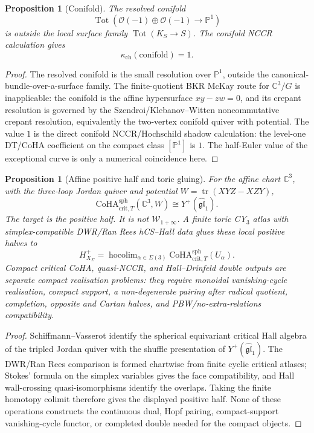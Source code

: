 \documentclass[11pt]{amsart}
\providecommand{\bC}{\mathbb{C}}
\providecommand{\bP}{\mathbb{P}}
\providecommand{\cO}{\mathcal{O}}
\providecommand{\CoHA}{\mathrm{CoHA}}
\providecommand{\Tot}{\operatorname{Tot}}
\newtheorem{proposition}[theorem]{Proposition}
\theoremstyle{definition}
\theoremstyle{remark}
\begin{document}
\begin{proposition}[Conifold]
The resolved conifold
\[
        \Tot(\cO(-1)\oplus\cO(-1)\to\bP^1)
\]
is outside the local surface family \(\Tot(K_S\to S)\). The conifold NCCR
calculation gives
\[
        \kappa_{\mathrm{ch}}(\mathrm{conifold})=1 .
\]
\end{proposition}

\begin{proof}
The resolved conifold is the small resolution over \(\bP^1\), outside the
canonical-bundle-over-a-surface family. The finite-quotient BKR McKay route
for \(\bC^3/G\) is inapplicable: the conifold is the affine hypersurface
\(xy-zw=0\), and its crepant resolution is governed by the
Szendroi/Klebanov--Witten noncommutative crepant resolution, equivalently
the two-vertex conifold quiver with potential. The value \(1\) is the
direct conifold NCCR/Hochschild shadow calculation: the level-one
DT/CoHA coefficient on the compact class \([\bP^1]\) is \(1\). The
half-Euler value of the exceptional curve is only a numerical coincidence
here.
\end{proof}

\begin{proposition}[Affine positive half and toric gluing]
For the affine chart \(\bC^3\), with the three-loop Jordan quiver and
potential \(W=\operatorname{tr}(XYZ-XZY)\),
\[
        \CoHA^{\mathrm{sph}}_{\mathrm{crit},T}(\bC^3,W)
        \cong
        Y^+(\widehat{\mathfrak{gl}}_1).
\]
The target is the positive half. It is not
\(\mathcal W_{1+\infty}\). A finite toric CY$_3$ atlas with
simplex-compatible DWR/Ran Rees hCS--Hall data glues these local positive
halves to
\[
        H^+_{X_\Sigma}
        =
        \operatorname{hocolim}_{\alpha\in\Sigma(3)}
        \CoHA^{\mathrm{sph}}_{\mathrm{crit},T}(U_\alpha).
\]
Compact critical CoHA, quasi-NCCR, and Hall--Drinfeld double outputs are
separate compact realisation problems: they require monoidal
vanishing-cycle realisation, compact support, a non-degenerate pairing
after radical quotient, completion, opposite and Cartan halves, and
PBW/no-extra-relations compatibility.
\end{proposition}

\begin{proof}
Schiffmann--Vasserot identify the spherical equivariant critical Hall
algebra of the tripled Jordan quiver with the shuffle presentation of
\(Y^+(\widehat{\mathfrak{gl}}_1)\). The DWR/Ran Rees comparison is formed
chartwise from finite cyclic critical atlases; Stokes' formula on the
simplex variables gives the face compatibility, and Hall wall-crossing
quasi-isomorphisms identify the overlaps. Taking the finite homotopy
colimit therefore gives the displayed positive half. None of these
operations constructs the continuous dual, Hopf pairing, compact-support
vanishing-cycle functor, or completed double needed for the compact
objects.
\end{proof}
\end{document}
